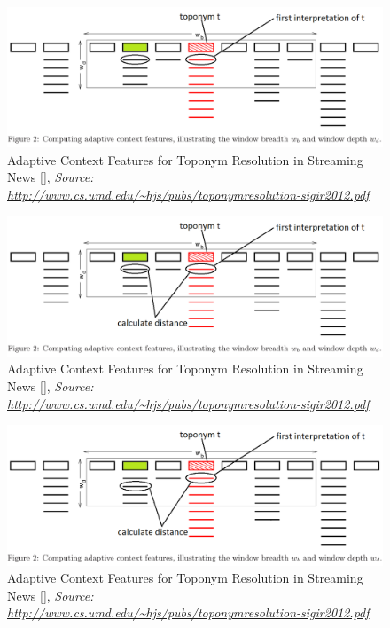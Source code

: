 \documentclass{beamer}
\begin{document}
{\begin{overprint}
		\begin{figure}
			\includegraphics[width=\textwidth]{adaptive-proximity-c.png} 
			\caption{Adaptive Context Features for Toponym Resolution in Streaming News [], \textit{Source: \url{http://www.cs.umd.edu/~hjs/pubs/toponymresolution-sigir2012.pdf}}}
		\end{figure}
		
		\begin{figure}
			\includegraphics[width=\textwidth]{adaptive-proximity-d.png} 
			\caption{Adaptive Context Features for Toponym Resolution in Streaming News [], \textit{Source: \url{http://www.cs.umd.edu/~hjs/pubs/toponymresolution-sigir2012.pdf}}}
		\end{figure}
		
		\begin{figure}
			\includegraphics[width=\textwidth]{adaptive-proximity-e.png} 
			\caption{Adaptive Context Features for Toponym Resolution in Streaming News [], \textit{Source: \url{http://www.cs.umd.edu/~hjs/pubs/toponymresolution-sigir2012.pdf}}}
		\end{figure}
		

\end{overprint}}
\end{document}
